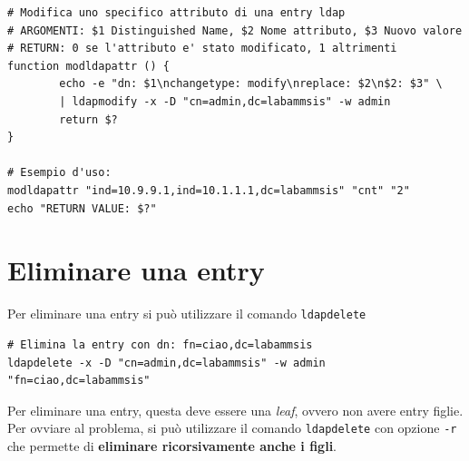 \documentclass[a4paper]{report}
\newenvironment{ricordati}{\begin{tcolorbox}[fonttitle=\sffamily\bfseries\large,title=Ricordati,colframe=orange!75!white]}{\end{tcolorbox}}
\newenvironment{funzioni}{\begin{tcolorbox}[fonttitle=\sffamily\bfseries\large,title=Funzioni Utili,colframe=darkgreen!75!white]}{\end{tcolorbox}}
\newenvironment{code}{\begin{tcolorbox}[size=small]}{\end{tcolorbox}}
\begin{document}
\begin{funzioni}
\begin{lstlisting}
# Modifica uno specifico attributo di una entry ldap
# ARGOMENTI: $1 Distinguished Name, $2 Nome attributo, $3 Nuovo valore
# RETURN: 0 se l'attributo e' stato modificato, 1 altrimenti
function modldapattr () {
        echo -e "dn: $1\nchangetype: modify\nreplace: $2\n$2: $3" \
        | ldapmodify -x -D "cn=admin,dc=labammsis" -w admin
        return $?
}

# Esempio d'uso:
modldapattr "ind=10.9.9.1,ind=10.1.1.1,dc=labammsis" "cnt" "2"
echo "RETURN VALUE: $?"
\end{lstlisting}
\end{funzioni}

\section{Eliminare una entry}

Per eliminare una entry si può utilizzare il comando \texttt{ldapdelete}

\begin{code}
\begin{lstlisting}
# Elimina la entry con dn: fn=ciao,dc=labammsis
ldapdelete -x -D "cn=admin,dc=labammsis" -w admin "fn=ciao,dc=labammsis"
\end{lstlisting}
\end{code}

\begin{ricordati}
	Per eliminare una entry, questa deve essere una \textit{leaf}, ovvero non avere entry figlie. Per ovviare al problema, si può utilizzare il comando \texttt{ldapdelete} con opzione \texttt{-r} che permette di \textbf{eliminare ricorsivamente anche i figli}.
\end{ricordati}




\end{document}
